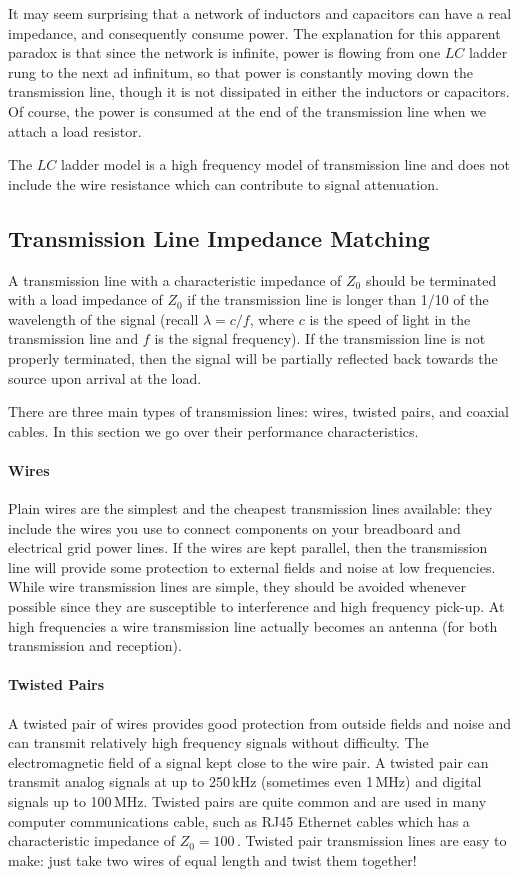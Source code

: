 \documentclass{article}
\begin{document}
It may seem surprising that a network of inductors and capacitors can have a real impedance, and consequently consume power. The explanation for this apparent paradox is that since the network is infinite, power is flowing from one $LC$ ladder rung to the next ad infinitum, so that power is constantly moving down the transmission line, though it is not dissipated in either the inductors or capacitors. Of course, the power is consumed at the end of the transmission line when we attach a load resistor.

The $LC$ ladder model is a high frequency model of transmission line and does not include the wire resistance which can contribute to signal attenuation. 

\subsection{Transmission Line Impedance Matching}
A transmission line with a characteristic impedance of $Z_0$ should be terminated with a load impedance of $Z_0$ if the transmission line is longer than 1/10 of the wavelength of the signal (recall $\lambda = c/f$, where $c$ is the speed of light in the transmission line and $f$ is the signal frequency). If the transmission line is not properly terminated, then the signal will be partially reflected back towards the source upon arrival at the load.

There are three main types of transmission lines: wires, twisted pairs, and coaxial cables. In this section we go over their performance characteristics.

\paragraph{Wires}
Plain wires are the simplest and the cheapest transmission lines available: they include the wires you use to connect components on your breadboard and electrical grid power lines. If the wires are kept parallel, then the transmission line will provide some protection to external fields and noise at low frequencies. While wire transmission lines are simple, they should be avoided whenever possible since they are susceptible to interference and high frequency pick-up. At high frequencies a wire transmission line actually becomes an antenna (for both transmission and reception).

\paragraph{Twisted Pairs}
A twisted pair of wires provides good protection from outside fields and noise and can transmit relatively high frequency signals without difficulty. The electromagnetic field of a signal kept close to the wire pair. A twisted pair can transmit analog signals at up to 250\,kHz (sometimes even 1\,MHz) and digital signals up to 100\,MHz. Twisted pairs are quite common and are used in many computer communications cable, such as RJ45 Ethernet cables which has a characteristic impedance of $Z_0 = 100$\,\Ohm. Twisted pair transmission lines are easy to make: just take two wires of equal length and twist them together!
\end{document}
